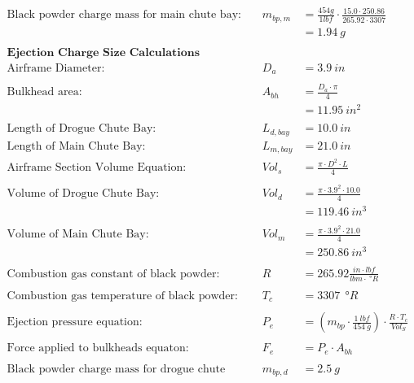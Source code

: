 \documentclass{article}
\begin{document}
\begin{align*}
		\text{Black powder charge mass for main chute bay: }& &m_{bp,m} &= \frac{454 g}{1 lbf} \cdot \frac{15.0 \cdot 250.86}{265.92  \cdot 3307} \\
		&& &= \SI{1.94}{g} \\ \\
		\textbf{Ejection Charge Size Calculations Reversed } \\
		\text{Airframe Diameter:}& &D_{a} &= \SI{3.9}{in} \\ \\
		\text{Bulkhead area:}& & A_{bh} &= \frac{D_{a} \cdot \pi}{4} \tag{eqn. 13} \\
		&& &= \SI{11.95}{in^2} \\ \\
		\text{Length of Drogue Chute Bay:}&&L_{d,bay} &= \SI{10.0}{in} \\
		\text{Length of Main Chute Bay:}&&L_{m,bay} &= \SI{21.0}{in} \\
		\text{Airframe Section Volume Equation:}& &Vol_{s} &= \frac{ \pi \cdot D^{2} \cdot L}{4} \tag{eqn. 14} \\ \\
		\text{Volume of Drogue Chute Bay:}&&Vol_{d} &= \frac{\pi \cdot 3.9^{2} \cdot10.0}{4} \\
		&& &= \SI{119.46}{in^3} \\ \\
		\text{Volume of Main Chute Bay:}&&Vol_{m} &= \frac{\pi \cdot 3.9^{2} \cdot21.0}{4} \\
		&& &= \SI{250.86}{in^3} \\ \\
		\text{Combustion gas constant of black powder:}& &R &= 265.92 \frac{in \cdot lbf}{lbm \cdot \SI{}{\degree R}} \\ \\
		\text{Combustion gas temperature of black powder:}& &T_{c} &= 3307 \: \SI{}{\degree R} \\ \\
		\text{Ejection pressure equation: }& &P_{e} &= \left( m_{bp} \cdot \frac{\SI{1}{lbf}}{\SI{454}{g}} \right) \cdot \frac{R \cdot T_{c}}{Vol_{S}} \tag{eqn. 15} \\ \\
		\text{Force applied to bulkheads equaton:}& &F_{e} &= P_{e} \cdot A_{bh} \tag{eqn. 16} \\ \\
		\text{Black powder charge mass for drogue chute bay:}& &m_{bp,d} &= \SI{2.5}{g} \\

\end{align*}
\end{document}
